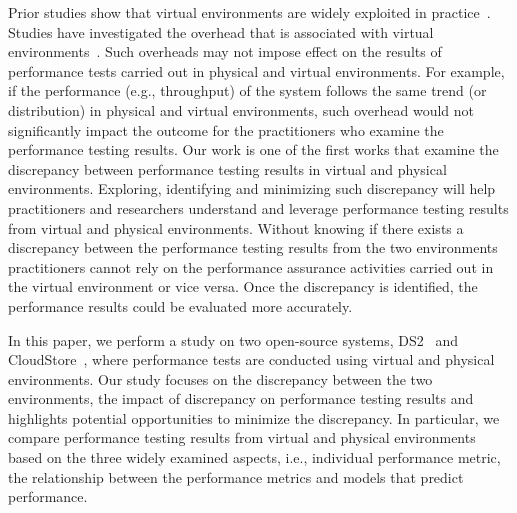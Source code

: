 \documentclass[smallextended]{svjour3}       %
\begin{document}
Prior studies show that virtual environments are widely exploited in practice~\cite{Cito:2015:MCA:2786805.2786826,Nguyen:2012:ADP:2188286.2188344,xiong2013vperfguard}. Studies have investigated the overhead that is associated with virtual environments~\cite{menon2005diagnosing}. Such overheads may not impose effect on the results of performance tests carried out in physical and virtual environments. For example, if the performance (e.g., throughput) of the system follows the same trend (or distribution) in physical and virtual environments, such overhead would not significantly impact the outcome for the practitioners who examine the performance testing results. Our work is one of the first works that examine the discrepancy between performance testing results in virtual and physical environments. Exploring, identifying and minimizing such discrepancy will help practitioners and researchers understand and leverage performance testing results from virtual and physical environments. Without knowing if there exists a discrepancy between the performance testing results from the two environments practitioners cannot rely on the performance assurance activities carried out in the virtual environment or vice versa. Once the discrepancy is identified, the performance results could be evaluated more accurately.

In this paper, we perform a study on two open-source systems, DS2~\cite{delldvd} and CloudStore~\cite{cloudstore}, where performance tests are conducted using virtual and physical environments. Our study focuses on the discrepancy between the two environments, the impact of discrepancy on performance testing results and highlights potential opportunities to minimize the discrepancy. In particular, we compare performance testing results from virtual and physical environments based on the three widely examined aspects, i.e., individual performance metric, the relationship between the performance metrics and models that predict performance. 
\end{document}
